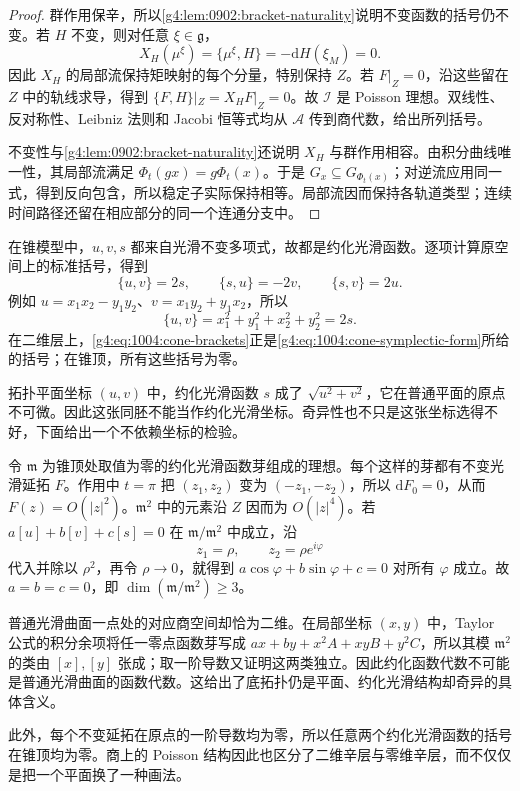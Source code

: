 \begin{proof}
	群作用保辛，所以\cref{g4:lem:0902:bracket-naturality}说明不变函数的括号仍不变。若 \(H\) 不变，则对任意 \(\xi\in\mathfrak g\)，
	\[
		X_H(\mu^\xi)=\{\mu^\xi,H\}
		=-\mathrm{d}H(\xi_M)=0.
	\]
	因此 \(X_H\) 的局部流保持矩映射的每个分量，特别保持 \(Z\)。若 \(F|_Z=0\)，沿这些留在 \(Z\) 中的轨线求导，得到 \(\{F,H\}|_Z=X_HF|_Z=0\)。故 \(\mathcal I\) 是 Poisson 理想。双线性、反对称性、Leibniz 法则和 Jacobi 恒等式均从 \(\mathcal A\) 传到商代数，给出所列括号。

	不变性与\cref{g4:lem:0902:bracket-naturality}还说明 \(X_H\) 与群作用相容。由积分曲线唯一性，其局部流满足 \(\Phi_t(gx)=g\Phi_t(x)\)。于是 \(G_x\subseteq G_{\Phi_t(x)}\)；对逆流应用同一式，得到反向包含，所以稳定子实际保持相等。局部流因而保持各轨道类型；连续时间路径还留在相应部分的同一个连通分支中。
\end{proof}

\begin{example}\label{g4:exm:1004:cone-smooth-poisson}
	在锥模型中，\(u,v,s\) 都来自光滑不变多项式，故都是约化光滑函数。逐项计算原空间上的标准括号，得到
	\begin{equation}\label{g4:eq:1004:cone-brackets}
		\{u,v\}=2s,\qquad \{s,u\}=-2v,\qquad \{s,v\}=2u.
	\end{equation}
	例如 \(u=x_1x_2-y_1y_2\)、\(v=x_1y_2+y_1x_2\)，所以
	\[
		\{u,v\}=x_1^2+y_1^2+x_2^2+y_2^2=2s.
	\]
	在二维层上，\eqref{g4:eq:1004:cone-brackets}正是\eqref{g4:eq:1004:cone-symplectic-form}所给的括号；在锥顶，所有这些括号为零。

	拓扑平面坐标 \((u,v)\) 中，约化光滑函数 \(s\) 成了 \(\sqrt{u^2+v^2}\)，它在普通平面的原点不可微。因此这张同胚不能当作约化光滑坐标。奇异性也不只是这张坐标选得不好，下面给出一个不依赖坐标的检验。

	令 \(\mathfrak m\) 为锥顶处取值为零的约化光滑函数芽组成的理想。每个这样的芽都有不变光滑延拓 \(F\)。作用中 \(t=\pi\) 把 \((z_1,z_2)\) 变为 \((-z_1,-z_2)\)，所以 \(\mathrm{d}F_0=0\)，从而 \(F(z)=O(|z|^2)\)。\(\mathfrak m^2\) 中的元素沿 \(Z\) 因而为 \(O(|z|^4)\)。若 \(a[u]+b[v]+c[s]=0\) 在 \(\mathfrak m/\mathfrak m^2\) 中成立，沿
	\[
		z_1=\rho,\qquad z_2=\rho e^{i\varphi}
	\]
	代入并除以 \(\rho^2\)，再令 \(\rho\to0\)，就得到 \(a\cos\varphi+b\sin\varphi+c=0\) 对所有 \(\varphi\) 成立。故 \(a=b=c=0\)，即 \(\dim(\mathfrak m/\mathfrak m^2)\ge3\)。

	普通光滑曲面一点处的对应商空间却恰为二维。在局部坐标 \((x,y)\) 中，Taylor 公式的积分余项将任一零点函数芽写成 \(ax+by+x^2A+xyB+y^2C\)，所以其模 \(\mathfrak m^2\) 的类由 \([x],[y]\) 张成；取一阶导数又证明这两类独立。因此约化函数代数不可能是普通光滑曲面的函数代数。这给出了底拓扑仍是平面、约化光滑结构却奇异的具体含义。

	此外，每个不变延拓在原点的一阶导数均为零，所以任意两个约化光滑函数的括号在锥顶均为零。商上的 Poisson 结构因此也区分了二维辛层与零维辛层，而不仅仅是把一个平面换了一种画法。
\end{example}

